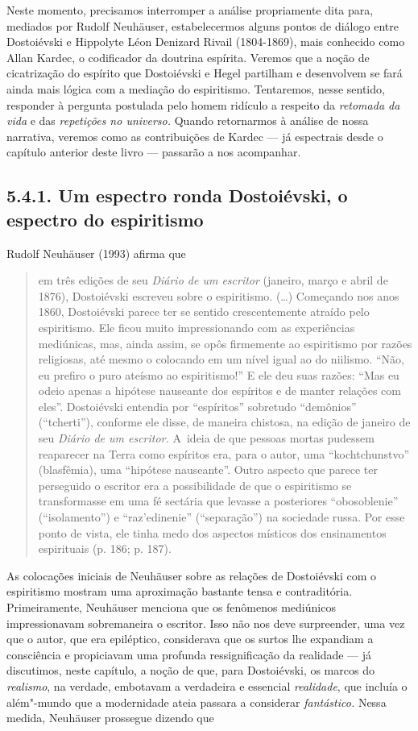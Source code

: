 Neste momento, precisamos interromper a análise propriamente dita para,
mediados por Rudolf Neuhäuser, estabelecermos alguns pontos de diálogo
entre Dostoiévski e Hippolyte Léon Denizard Rivail (1804-1869), mais
conhecido como Allan Kardec, o codificador da doutrina espírita. Veremos
que a noção de cicatrização do espírito que Dostoiévski e Hegel
partilham e desenvolvem se fará ainda mais lógica com a mediação do
espiritismo. Tentaremos, nesse sentido, responder à pergunta postulada
pelo homem ridículo a respeito da \emph{retomada da vida} e das
\emph{repetições no universo.} Quando retornarmos à análise de nossa
narrativa, veremos como as contribuições de Kardec --- já espectrais
desde o capítulo anterior deste livro --- passarão a nos acompanhar.

\subsection{5.4.1. Um espectro ronda Dostoiévski, o espectro do espiritismo}

Rudolf Neuhäuser (1993) afirma que

\begin{quote}
em três edições de seu \emph{Diário de um escritor} (janeiro, março e
abril de 1876), Dostoiévski escreveu sobre o espiritismo. (\ldots)
Começando nos anos 1860, Dostoiévski parece ter se sentido
crescentemente atraído pelo espiritismo. Ele ficou muito impressionando
com as experiências mediúnicas, mas, ainda assim, se opôs firmemente ao
espiritismo por razões religiosas, até mesmo o colocando em um nível
igual ao do niilismo. ``Não, eu prefiro o puro ateísmo ao espiritismo!''
E ele deu suas razões: ``Mas eu odeio apenas a hipótese nauseante dos
espíritos e de manter relações com eles''. Dostoiévski entendia por
``espíritos'' sobretudo ``demônios'' (``tcherti''), conforme ele disse,
de maneira chistosa, na edição de janeiro de seu \emph{Diário de um
escritor.} A~ideia de que pessoas mortas pudessem reaparecer na Terra
como espíritos era, para o autor, uma ``kochtchunstvo'' (blasfêmia), uma
``hipótese nauseante''. Outro aspecto que parece ter perseguido o
escritor era a possibilidade de que o espiritismo se transformasse em
uma fé sectária que levasse a posteriores ``obosoblenie''
(``isolamento'') e ``raz'edinenie'' (``separação'') na sociedade
russa. Por esse ponto de vista, ele tinha medo dos aspectos místicos dos
ensinamentos espirituais (p. 186; p. 187).
\end{quote}

As colocações iniciais de Neuhäuser sobre as relações de Dostoiévski com
o espiritismo mostram uma aproximação bastante tensa e contraditória.
Primeiramente, Neuhäuser menciona que os fenômenos mediúnicos
impressionavam sobremaneira o escritor. Isso não nos deve surpreender,
uma vez que o autor, que era epiléptico, considerava que os surtos lhe
expandiam a consciência e propiciavam uma profunda ressignificação da
realidade --- já discutimos, neste capítulo, a noção de que, para
Dostoiévski, os marcos do \emph{realismo}, na verdade, embotavam a
verdadeira e essencial \emph{realidade}, que incluía o além"-mundo que a
modernidade ateia passara a considerar \emph{fantástico.} Nessa medida,
Neuhäuser prossegue dizendo que

